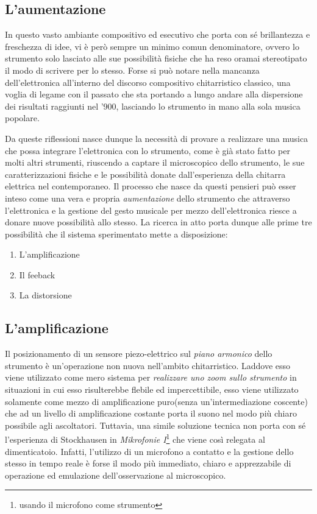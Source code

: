 \documentclass[oneside]{article}
\begin{document}
\begin{multicols*}{2}

\section{ L’aumentazione}
\noindent

In questo vasto ambiante compositivo ed esecutivo che porta con sé brillantezza e freschezza di idee, vi è però sempre un minimo comun denominatore, ovvero lo strumento solo lasciato alle sue possibilità fisiche che ha reso oramai stereotipato il modo di scrivere per lo stesso. Forse si può notare nella mancanza dell'elettronica all'interno del discorso compositivo chitarristico classico, una voglia di legame con il passato che sta portando a lungo andare alla dispersione dei risultati raggiunti nel '900, lasciando lo strumento in mano alla sola musica popolare.\newline

\noindent Da queste riflessioni nasce dunque la necessità di provare a realizzare una musica che possa integrare l'elettronica con lo strumento, come è già stato fatto per molti altri strumenti, riuscendo a captare il microscopico dello strumento, le sue caratterizzazioni fisiche e le possibilità donate dall'esperienza della chitarra elettrica nel contemporaneo. Il processo che nasce da questi pensieri può esser inteso come una vera e propria \textit{aumentazione} dello strumento che attraverso l'elettronica e la gestione del gesto musicale per mezzo dell'elettronica riesce a donare nuove possibilità allo stesso. La ricerca in atto porta dunque alle prime tre possibilità che il sistema sperimentato mette a disposizione: 
\begin{enumerate}[label=(\roman*)]
\item L'amplificazione
\item Il feeback 
\item La distorsione
\end{enumerate}

\subsection{L'amplificazione} 
Il posizionamento di un sensore piezo-elettrico sul \textit{piano armonico} dello strumento è un'operazione non nuova nell'ambito chitarristico. Laddove esso viene utilizzato come mero sistema per \textit{realizzare uno zoom sullo strumento} in situazioni in cui esso risulterebbe flebile ed impercettibile, esso viene utilizzato solamente come mezzo di amplificazione puro(senza un'intermediazione coscente) che ad un livello di amplificazione costante porta il suono nel modo più chiaro possibile agli ascoltatori. Tuttavia, una simile soluzione tecnica non porta con sé l’esperienza di Stockhausen in \textit{Mikrofonie I}\footnote{usando il microfono come strumento} che viene così relegata 
al dimenticatoio. Infatti, l'utilizzo di un microfono a contatto e la gestione dello stesso in tempo reale è forse il modo più immediato, chiaro e apprezzabile di operazione ed emulazione dell'osservazione al microscopico.


\end{multicols*}
\end{document}
